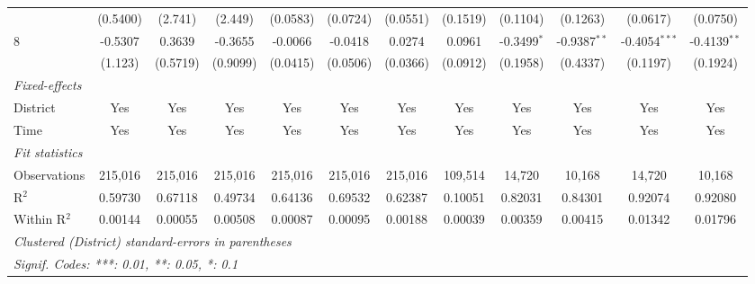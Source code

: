 \begin{table}[htbp]
\begin{tabular}{lccccccccccc}
                           & (0.5400)     & (2.741)       & (2.449)      & (0.0583)       & (0.0724)       & (0.0551)       & (0.1519)                 & (0.1104)       & (0.1263)       & (0.0617)         & (0.0750)\\   
      8                    & -0.5307      & 0.3639        & -0.3655      & -0.0066        & -0.0418        & 0.0274         & 0.0961                   & -0.3499$^{*}$  & -0.9387$^{**}$ & -0.4054$^{***}$  & -0.4139$^{**}$\\   
                           & (1.123)      & (0.5719)      & (0.9099)     & (0.0415)       & (0.0506)       & (0.0366)       & (0.0912)                 & (0.1958)       & (0.4337)       & (0.1197)         & (0.1924)\\   
      \midrule
      \emph{Fixed-effects}\\
      District             & Yes          & Yes           & Yes          & Yes            & Yes            & Yes            & Yes                      & Yes            & Yes            & Yes              & Yes\\  
      Time                 & Yes          & Yes           & Yes          & Yes            & Yes            & Yes            & Yes                      & Yes            & Yes            & Yes              & Yes\\  
      \midrule
      \emph{Fit statistics}\\
      Observations         & 215,016      & 215,016       & 215,016      & 215,016        & 215,016        & 215,016        & 109,514                  & 14,720         & 10,168         & 14,720           & 10,168\\  
      R$^2$                & 0.59730      & 0.67118       & 0.49734      & 0.64136        & 0.69532        & 0.62387        & 0.10051                  & 0.82031        & 0.84301        & 0.92074          & 0.92080\\  
      Within R$^2$         & 0.00144      & 0.00055       & 0.00508      & 0.00087        & 0.00095        & 0.00188        & 0.00039                  & 0.00359        & 0.00415        & 0.01342          & 0.01796\\  
      \midrule \midrule
      \multicolumn{12}{l}{\emph{Clustered (District) standard-errors in parentheses}}\\
      \multicolumn{12}{l}{\emph{Signif. Codes: ***: 0.01, **: 0.05, *: 0.1}}\\
   \end{tabular}
\end{table}


